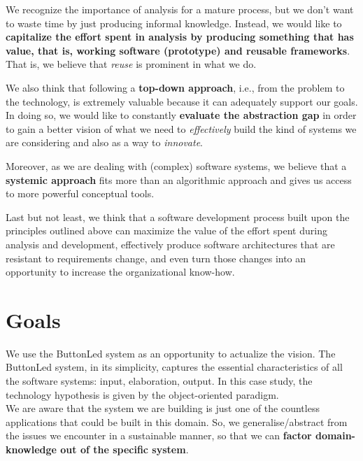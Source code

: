 \documentclass{article}
\newcommand{\labelsec}[1]{\label{sec:#1}}
\begin{document}
We recognize the importance of analysis for a mature process, but we don't want
to waste time by just producing informal knowledge. Instead, we would like to \textbf{capitalize the
effort spent in analysis by producing something that has value, that is, working software (prototype) and reusable frameworks}.
That is, we believe that \emph{reuse} is prominent in what we do.

We also think that following a \textbf{top-down approach}, i.e., from the
problem to the technology, is extremely valuable because it can adequately
support our goals. In doing so, we would like to constantly \textbf{evaluate the
abstraction gap} in order to gain a better vision of what we need to
\emph{effectively} build the kind of systems we are considering and also as a
way to \emph{innovate}.

Moreover, as we are dealing with (complex) software systems, we believe
that a \textbf{systemic approach} fits more than an algorithmic approach and 
gives us access to more powerful conceptual tools.

Last but not least, we think that a software development process built upon the
principles outlined above can maximize the value of the effort spent
during analysis and development, effectively produce software architectures that
are resistant to requirements change, and even turn those changes into an
opportunity to increase the organizational know-how.



\section{Goals}
\labelsec{Goals}

 We use the ButtonLed system as an opportunity to actualize the vision. The
 ButtonLed system, in its simplicity, captures the essential characteristics of
 all the software systems: input, elaboration, output. In this case study, the
 technology hypothesis is given by the object-oriented paradigm.\\

We are aware that the system we are building is just one of the countless
applications that could be built in this domain. So, we generalise/abstract from
the issues we encounter in a sustainable manner, so that we can \textbf{factor
domain-knowledge out of the specific system}.
\end{document}
